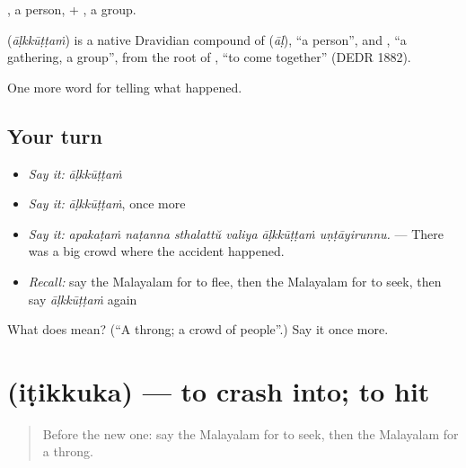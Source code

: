 , a person, + , a group.

\begin{cousinweb}
\textbf{} (\emph{āḷkkūṭṭaṁ}) is a native Dravidian compound of  (\emph{āḷ}), \textquotedblleft{}a person\textquotedblright{}, and , \textquotedblleft{}a gathering, a group\textquotedblright{}, from the root of , \textquotedblleft{}to come together\textquotedblright{} (DEDR 1882).
\end{cousinweb}

\begin{grammarlens}[title={What you've built}]
One more word for telling what happened.
\end{grammarlens}

\subsection*{Your turn}
\begin{itemize}
\raggedright
  \item \emph{Say it:} \emph{āḷkkūṭṭaṁ}
  \item \emph{Say it:} \emph{āḷkkūṭṭaṁ}, once more
  \item \emph{Say it:} \emph{apakaṭaṁ naṭanna sthalattŭ valiya āḷkkūṭṭaṁ uṇṭāyirunnu.} — There was a big crowd where the accident happened.
  \item \emph{Recall:} say the Malayalam for to flee, then the Malayalam for to seek, then say \emph{āḷkkūṭṭaṁ} again
\end{itemize}

\begin{tcolorbox}[breakable,colback=teal!4,colframe=teal!35!black,title={Before you move on}]
What does  mean? (\textquotedblleft{}A throng; a crowd of people\textquotedblright{}.) Say it once more.
\end{tcolorbox}
\section[\texorpdfstring{\ml{ഇടിക്കുക} (iṭikkuka)}{ഇടിക്കുക (iṭikkuka)}]{ (iṭikkuka) — to crash into; to hit}

\label{lesson:ML-C379-itikkuka}



\begin{quote}
Before the new one: say the Malayalam for to seek, then the Malayalam for a throng.
\end{quote}

